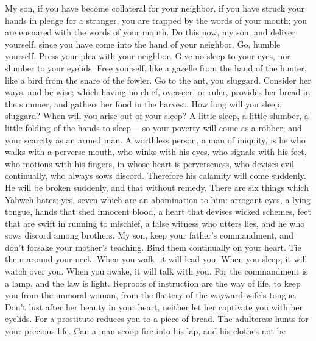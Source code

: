  My son, if you have become collateral for your neighbor, if
you have struck your hands in pledge for a stranger,  you
are trapped by the words of your mouth; you are ensnared with the words
of your mouth.  Do this now, my son, and deliver yourself,
since you have come into the hand of your neighbor. Go, humble yourself.
Press your plea with your neighbor.  Give no sleep to your
eyes, nor slumber to your eyelids.  Free yourself, like a
gazelle from the hand of the hunter, like a bird from the snare of the
fowler.  Go to the ant, you sluggard. Consider her ways, and
be wise;  which having no chief, overseer, or ruler,
 provides her bread in the summer, and gathers her food in
the harvest.  How long will you sleep, sluggard? When will
you arise out of your sleep?  A little sleep, a little
slumber, a little folding of the hands to sleep---  so your
poverty will come as a robber, and your scarcity as an armed man.
 A worthless person, a man of iniquity, is he who walks
with a perverse mouth,  who winks with his eyes, who
signals with his feet, who motions with his fingers,  in
whose heart is perverseness, who devises evil continually, who always
sows discord.  Therefore his calamity will come suddenly.
He will be broken suddenly, and that without remedy.  There
are six things which Yahweh hates; yes, seven which are an abomination
to him:  arrogant eyes, a lying tongue, hands that shed
innocent blood,  a heart that devises wicked schemes, feet
that are swift in running to mischief,  a false witness who
utters lies, and he who sows discord among brothers.  My
son, keep your father's commandment, and don't forsake your mother's
teaching.  Bind them continually on your heart. Tie them
around your neck.  When you walk, it will lead you. When
you sleep, it will watch over you. When you awake, it will talk with
you.  For the commandment is a lamp, and the law is light.
Reproofs of instruction are the way of life,  to keep you
from the immoral woman, from the flattery of the wayward wife's tongue.
 Don't lust after her beauty in your heart, neither let her
captivate you with her eyelids.  For a prostitute reduces
you to a piece of bread. The adulteress hunts for your precious life.
 Can a man scoop fire into his lap, and his clothes not be
